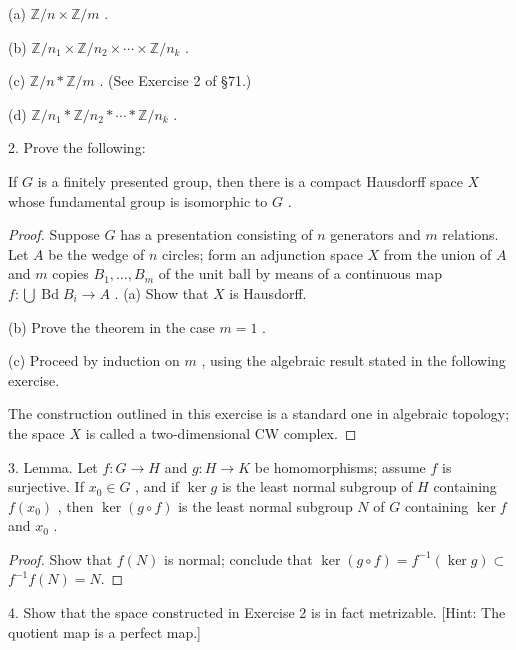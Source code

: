 (a) \(\mathbb{Z}/n \times  \mathbb{Z}/m\) .

(b) \(\mathbb{Z}/{n}_{1} \times  \mathbb{Z}/{n}_{2} \times  \cdots  \times  \mathbb{Z}/{n}_{k}\) .

(c) \(\mathbb{Z}/n * \mathbb{Z}/m\) . (See Exercise 2 of  \S 71.)

(d) \(\mathbb{Z}/{n}_{1} * \mathbb{Z}/{n}_{2} * \cdots  * \mathbb{Z}/{n}_{k}\) .

2. Prove the following:

\begin{theorem} If \(G\) is a finitely presented group, then there is a compact Hausdorff space \(X\) whose fundamental group is isomorphic to \(G\) .
\end{theorem}

\begin{proof}Suppose \(G\) has a presentation consisting of \(n\) generators and \(m\) relations. Let \(A\) be the wedge of \(n\) circles; form an adjunction space \(X\) from the union of \(A\) and \(m\) copies \({B}_{1},\ldots ,{B}_{m}\) of the unit ball by means of a continuous map \(f : \bigcup \operatorname{Bd}{B}_{i} \rightarrow  A\) .
(a) Show that \(X\) is Hausdorff.

(b) Prove the theorem in the case \(m = 1\) .

(c) Proceed by induction on \(m\) , using the algebraic result stated in the following exercise.

The construction outlined in this exercise is a standard one in algebraic topology; the space \(X\) is called a two-dimensional CW complex.
\end{proof}

3. Lemma. Let \(f : G \rightarrow  H\) and \(g : H \rightarrow  K\) be homomorphisms; assume \(f\) is surjective. If \({x}_{0} \in  G\) , and if \(\ker g\) is the least normal subgroup of \(H\) containing \(f\left( {x}_{0}\right)\) , then \(\ker \left( {g \circ  f}\right)\) is the least normal subgroup \(N\) of \(G\) containing \(\ker f\) and \({x}_{0}\) .

\begin{proof}Show that \(f\left( N\right)\) is normal; conclude that \(\ker \left( {g \circ  f}\right)  = {f}^{-1}\left( {\ker g}\right)  \subset\)  \({f}^{-1}f\left( N\right)  = N.\)
\end{proof}
4. Show that the space constructed in Exercise 2 is in fact metrizable. [Hint: The quotient map is a perfect map.]